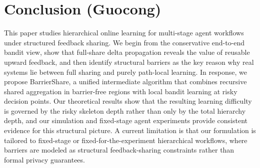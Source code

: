\section{Conclusion (Guocong)}

This paper studies hierarchical online learning for multi-stage agent workflows under structured feedback sharing. We begin from the conservative end-to-end bandit view, show that full-share delta propagation reveals the value of reusable upward feedback, and then identify structural barriers as the key reason why real systems lie between full sharing and purely path-local learning. In response, we propose BarrierShare, a unified intermediate algorithm that combines recursive shared aggregation in barrier-free regions with local bandit learning at risky decision points. Our theoretical results show that the resulting learning difficulty is governed by the risky skeleton depth rather than only by the total hierarchy depth, and our simulation and fixed-stage agent experiments provide consistent evidence for this structural picture. A current limitation is that our formulation is tailored to fixed-stage or fixed-for-the-experiment hierarchical workflows, where barriers are modeled as structural feedback-sharing constraints rather than formal privacy guarantees.